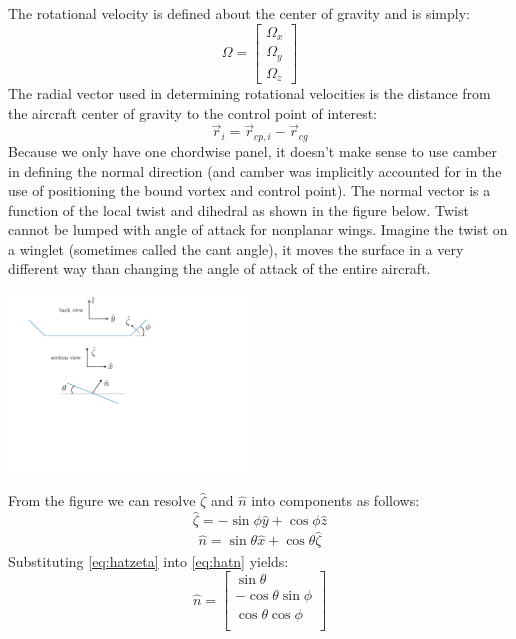 \documentclass{article}
\begin{document}
The rotational velocity is defined about the center of gravity and is simply:
\begin{equation}
    \Omega =
    \begin{bmatrix}
    \Omega_x\\ \Omega_y\\ \Omega_z
    \end{bmatrix}
\end{equation}
The radial vector used in determining rotational velocities is the distance from the aircraft center of gravity to the control point of interest:
\begin{equation}
\vec{r}_i = \vec r_{cp, i} - \vec r_{cg}
\end{equation}
Because we only have one chordwise panel, it doesn't make sense to use camber in defining the normal direction (and camber was implicitly accounted for in the use of positioning the bound vortex and control point).  The normal vector is a function of the local twist and dihedral as shown in the figure below.  Twist cannot be lumped with angle of attack for nonplanar wings.  Imagine the twist on a winglet (sometimes called the cant angle), it moves  the surface in a very different way than changing the angle of attack of the entire aircraft.
\begin{center}
\includegraphics[width=2.5in]{figs/normalvector}
\end{center}
From the figure we can resolve $\hat\zeta$ and $\hat{n}$ into components as follows:
\begin{equation}
\hat\zeta = -\sin\phi \hat{y} + \cos\phi \hat{z}
\label{eq:hatzeta}
\end{equation}
\begin{align}
\hat{n} = \sin\theta \hat{x} + \cos\theta \hat{\zeta}
\label{eq:hatn}
\end{align}
Substituting \cref{eq:hatzeta} into \cref{eq:hatn} yields:
\begin{equation}
    \hat{n} =
    \begin{bmatrix}
        \sin\theta\\
        -\cos\theta\sin\phi\\
        \cos\theta\cos\phi\\
    \end{bmatrix}
\end{equation}
\end{document}
